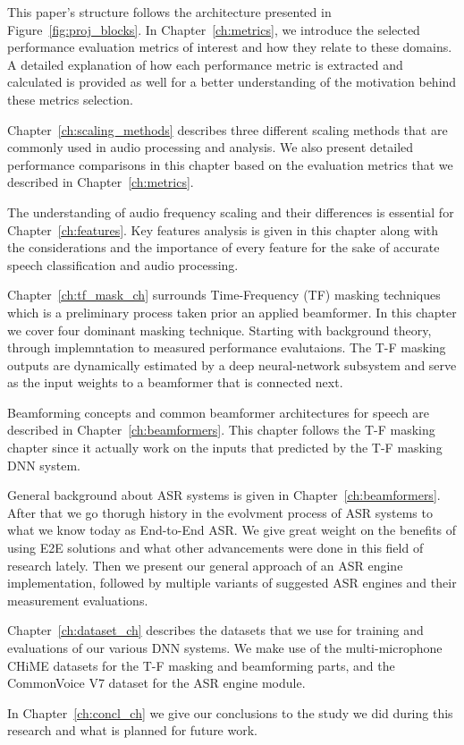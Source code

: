 This paper's structure follows the architecture
presented in Figure~\ref{fig:proj_blocks}.
In Chapter~\ref{ch:metrics}, 
we introduce the selected performance evaluation metrics
of interest and how they relate to these domains. 
A detailed explanation of how each performance metric is
extracted and calculated is provided as well
for a better understanding of the motivation behind
these metrics selection.

Chapter~\ref{ch:scaling_methods} describes three different scaling methods
that are commonly used in audio processing and analysis.
We also present detailed performance comparisons in this chapter based on
the evaluation metrics that we described in Chapter~\ref{ch:metrics}.

The understanding of audio frequency scaling and their differences
is essential for Chapter~\ref{ch:features}. 
Key features analysis is given in this chapter along with
the considerations and the importance of every feature
for the sake of accurate speech classification and audio processing. 

Chapter~\ref{ch:tf_mask_ch} surrounds Time-Frequency (TF) 
masking techniques which is a preliminary process taken prior
an applied beamformer. In this chapter we cover four
dominant masking technique. Starting with background theory,
through implemntation to measured performance evalutaions.
The T-F masking outputs are dynamically estimated
by a deep neural-network subsystem 
and serve as the input weights
to a beamformer that is connected next.

Beamforming concepts and 
common beamformer architectures for speech
are described in Chapter~\ref{ch:beamformers}.
This chapter follows the T-F masking chapter
since it actually work on the inputs that predicted
by the T-F masking DNN system.

General background about 
ASR systems is given in
Chapter~\ref{ch:beamformers}.
After that we go thorugh history in the evolvment process
of ASR systems to what we know today as End-to-End ASR.
We give great weight on the benefits of using E2E solutions
and what other advancements were done in this field of research lately.
Then we present our general approach of an ASR engine implementation,
followed by multiple variants of 
suggested ASR engines and their measurement evaluations.

Chapter~\ref{ch:dataset_ch} describes the datasets that
we use for training and evaluations of our various
DNN systems. We make use of the multi-microphone CHiME datasets
for the T-F masking and beamforming parts, 
and the CommonVoice V7 dataset for the ASR engine module.

In Chapter~\ref{ch:concl_ch} we give our conclusions to the study
we did during this research and what is planned for future work.